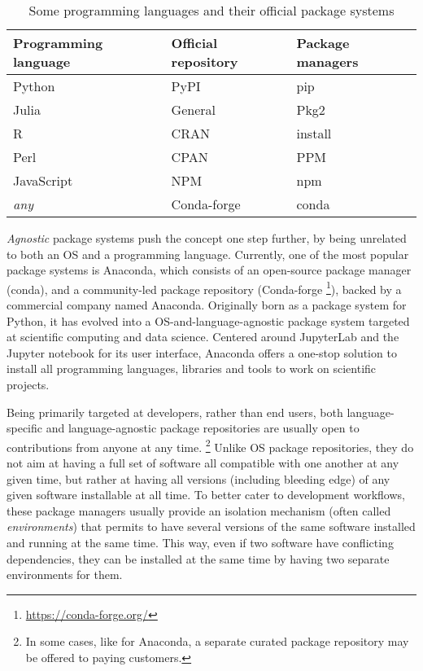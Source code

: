 \documentclass{deliverablereport}
\begin{document}
\begin{table}
  \centering
  \begin{tabular}{l | l | l}
    Programming language & Official repository & Package managers\\
    \hline
    Python & PyPI & pip\\
    Julia & General & Pkg2\\
    R & CRAN & install\\
    Perl & CPAN & PPM\\
    JavaScript & NPM & npm \\
    \emph{any} & Conda-forge & conda
  \end{tabular}
  \caption{Some programming languages and their official package systems}
  \label{tab:pkg-lang}
\end{table}

\emph{Agnostic} package systems push the concept one step further, by
being unrelated to both an OS and a programming language. %
Currently, one of the most popular package systems is Anaconda, which
consists of an open-source package manager (conda), and a
community-led package repository (Conda-forge%
\footnote{\url{https://conda-forge.org/}}), %
backed by a commercial company named Anaconda. %
Originally born as a package system for Python, it has evolved into a
OS-and-language-agnostic package system targeted at scientific
computing and data science. %
Centered around JupyterLab and the Jupyter notebook for its user
interface, Anaconda offers a one-stop solution to install all
programming languages, libraries and tools to work on scientific
projects.

Being primarily targeted at developers, rather than end users, both
language-specific and language-agnostic package repositories are
usually open to contributions from anyone at any time.%
\footnote{In some cases, like for Anaconda, a separate curated package
  repository may be offered to paying customers.} %
Unlike OS package repositories, they do not aim at having a full set
of software all compatible with one another at any given time, but
rather at having all versions (including bleeding edge) of any given
software installable at all time. %
To better cater to development workflows, these package managers
usually provide an isolation mechanism (often called
\emph{environments}) that permits to have several versions of the same
software installed and running at the same time. %
This way, even if two software have conflicting dependencies, they can
be installed at the same time by having two separate environments for
them.
\end{document}
